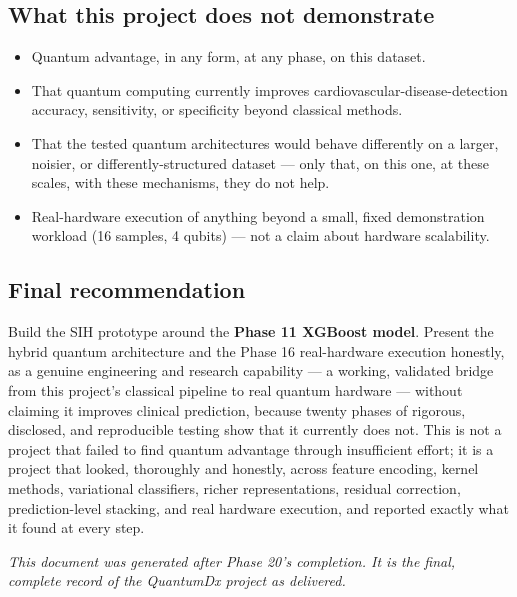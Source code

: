 \documentclass[11pt,a4paper]{article}
\begin{document}
\subsection{What this project does not demonstrate}
\begin{itemize}[leftmargin=1.4em]
  \item Quantum advantage, in any form, at any phase, on this dataset.
  \item That quantum computing currently improves cardiovascular-disease-detection accuracy, sensitivity, or specificity beyond classical methods.
  \item That the tested quantum architectures would behave differently on a larger, noisier, or differently-structured dataset --- only that, on this one, at these scales, with these mechanisms, they do not help.
  \item Real-hardware execution of anything beyond a small, fixed demonstration workload (16 samples, 4 qubits) --- not a claim about hardware scalability.
\end{itemize}

\subsection{Final recommendation}
Build the SIH prototype around the \textbf{Phase 11 XGBoost model}. Present the hybrid quantum architecture and the Phase 16 real-hardware execution honestly, as a genuine engineering and research capability --- a working, validated bridge from this project's classical pipeline to real quantum hardware --- without claiming it improves clinical prediction, because twenty phases of rigorous, disclosed, and reproducible testing show that it currently does not. This is not a project that failed to find quantum advantage through insufficient effort; it is a project that looked, thoroughly and honestly, across feature encoding, kernel methods, variational classifiers, richer representations, residual correction, prediction-level stacking, and real hardware execution, and reported exactly what it found at every step.

\vspace{1em}
\noindent\textit{This document was generated after Phase 20's completion. It is the final, complete record of the QuantumDx project as delivered.}
\end{document}

